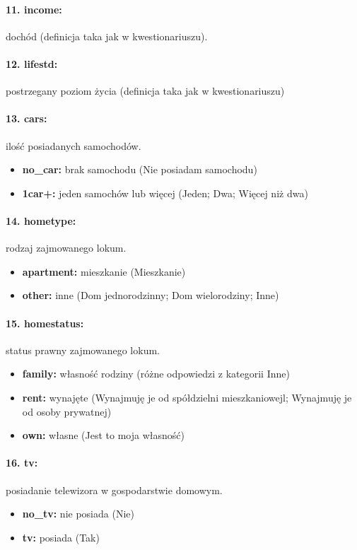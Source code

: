 \documentclass[10pt, a4paper]{article}
\begin{document}
\paragraph{11. income:} dochód (definicja taka jak w kwestionariuszu).
\paragraph{12. lifestd:} postrzegany poziom życia (definicja taka jak w kwestionariuszu)
\paragraph{13. cars:} ilość posiadanych samochodów.
\begin{itemize}
	\item {\bf no\_car:} brak samochodu (Nie posiadam samochodu)
	\item {\bf 1car+:} jeden samochów lub więcej (Jeden; Dwa; Więcej niż dwa)
\end{itemize}
\paragraph{14. hometype:} rodzaj zajmowanego lokum.
\begin{itemize}
	\item {\bf apartment:} mieszkanie (Mieszkanie)
	\item {\bf other:} inne	(Dom jednorodzinny; Dom wielorodziny; Inne)
\end{itemize}
\paragraph{15. homestatus:} status prawny zajmowanego lokum.
\begin{itemize}
	\item {\bf family:} własność rodziny (różne odpowiedzi z kategorii Inne)
	\item {\bf rent:} wynajęte (Wynajmuję je od spółdzielni mieszkaniowejl; Wynajmuję je od osoby prywatnej)
	\item {\bf own:} własne	(Jest to moja własność)
\end{itemize}
\paragraph{16. tv:} posiadanie telewizora w gospodarstwie domowym.
\begin{itemize}
	\item {\bf no\_tv:} nie posiada (Nie)
	\item {\bf tv:} posiada (Tak)
\end{itemize}
\end{document}
